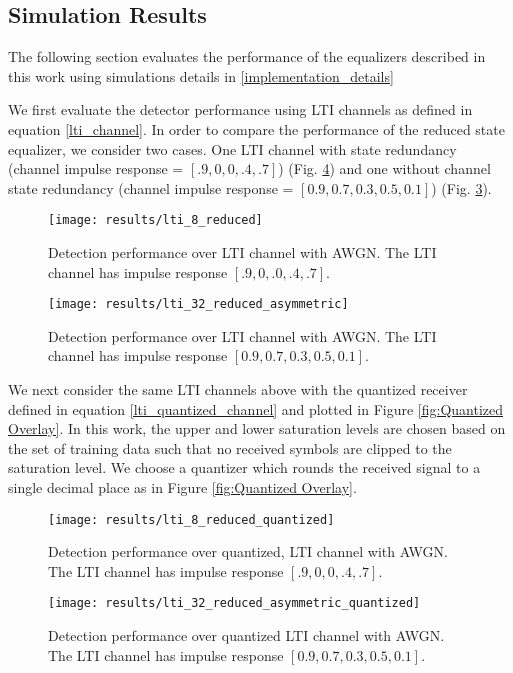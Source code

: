 \subsection{Simulation Results}
The following section evaluates the performance of the equalizers described in this work using simulations details in \ref{implementation_details}
\par
We first evaluate the detector performance using LTI channels as defined in equation \eqref{lti_channel}. In order to compare the performance of the reduced state equalizer, we consider two cases. One LTI channel with state redundancy (channel impulse response = $[.9, 0, 0, .4, .7]$) (Fig. \ref{fig:LTI performance redundant}) and one without channel state redundancy (channel impulse response = $[0.9, 0.7, 0.3, 0.5, 0.1]$) (Fig. \ref{fig:LTI performance}). 
\begin{figure}[H]
	\texttt{[image: results/lti\_8\_reduced]}
		  \caption{Detection performance over LTI channel with AWGN. The LTI channel has impulse response  $[.9, 0, .0, .4, .7]$.}
	  \label{fig:LTI performance}
\end{figure}
\begin{figure}[H]
	\texttt{[image: results/lti\_32\_reduced\_asymmetric]}
		  \caption{Detection performance over LTI channel with AWGN.  The LTI channel has impulse response  $[0.9, 0.7, 0.3, 0.5, 0.1]$.}
	  \label{fig:LTI performance redundant}
\end{figure}

We next consider the same LTI channels above with the quantized receiver defined in equation \eqref{lti_quantized_channel} and plotted in Figure \ref{fig:Quantized Overlay}.
In this work, the upper and lower saturation levels are chosen based on the set of training data such that no received symbols are clipped to the saturation level. We choose a quantizer which rounds the received signal to a single decimal place as in Figure \ref{fig:Quantized Overlay}.

\begin{figure}[htp]
	\texttt{[image: results/lti\_8\_reduced\_quantized]}
		  \caption{Detection performance over quantized, LTI channel with AWGN. The LTI channel has impulse response  $[.9, 0, 0, .4, .7]$. }
	  \label{fig:LTI performance}
\end{figure}

\begin{figure}[H]
	\texttt{[image: results/lti\_32\_reduced\_asymmetric\_quantized]}
		  \caption{Detection performance over quantized LTI channel with AWGN.  The LTI channel has impulse response  $[0.9, 0.7, 0.3, 0.5, 0.1]$.}
	  \label{fig:LTI performance redundant}
\end{figure}

